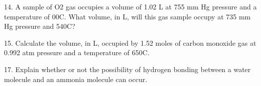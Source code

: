 \documentclass[addpoints, 12pt]{exam}
\begin{document}
\begin{questions}
14. A sample of O2 gas occupies a volume of 1.02 L at 755 mm Hg
pressure and a temperature of 00C.  What volume, in L, will this gas
sample occupy at 735 mm Hg pressure and 540C?


15. Calculate the volume, in L, occupied by 1.52 moles of carbon
monoxide gas at 0.992 atm pressure and a temperature of 650C.





17. Explain whether or not the possibility of hydrogen bonding between
a water molecule and an ammonia molecule can occur.







\end{questions}
\end{document}
